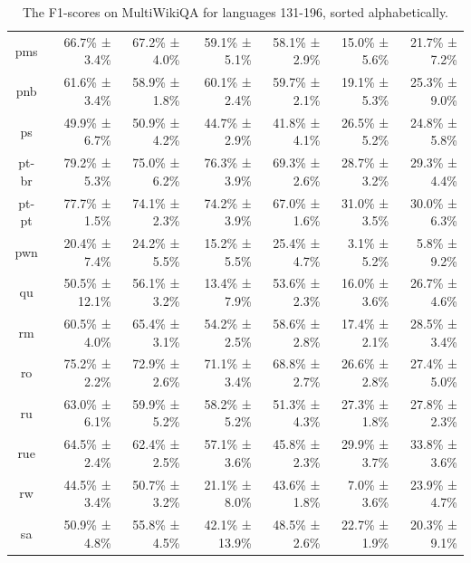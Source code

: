 \documentclass[10pt, a4paper]{article}
\begin{document}
\begin{table}[h]
\begin{tabular}{crrrrrr}
pms & 66.7\% ± 3.4\% & 67.2\% ± 4.0\% & 59.1\% ± 5.1\% & 58.1\% ± 2.9\% & 15.0\% ± 5.6\% & 21.7\% ± 7.2\% \\
pnb & 61.6\% ± 3.4\% & 58.9\% ± 1.8\% & 60.1\% ± 2.4\% & 59.7\% ± 2.1\% & 19.1\% ± 5.3\% & 25.3\% ± 9.0\% \\
ps & 49.9\% ± 6.7\% & 50.9\% ± 4.2\% & 44.7\% ± 2.9\% & 41.8\% ± 4.1\% & 26.5\% ± 5.2\% & 24.8\% ± 5.8\% \\
pt-br & 79.2\% ± 5.3\% & 75.0\% ± 6.2\% & 76.3\% ± 3.9\% & 69.3\% ± 2.6\% & 28.7\% ± 3.2\% & 29.3\% ± 4.4\% \\
pt-pt & 77.7\% ± 1.5\% & 74.1\% ± 2.3\% & 74.2\% ± 3.9\% & 67.0\% ± 1.6\% & 31.0\% ± 3.5\% & 30.0\% ± 6.3\% \\
pwn & 20.4\% ± 7.4\% & 24.2\% ± 5.5\% & 15.2\% ± 5.5\% & 25.4\% ± 4.7\% & 3.1\% ± 5.2\% & 5.8\% ± 9.2\% \\
qu & 50.5\% ± 12.1\% & 56.1\% ± 3.2\% & 13.4\% ± 7.9\% & 53.6\% ± 2.3\% & 16.0\% ± 3.6\% & 26.7\% ± 4.6\% \\
rm & 60.5\% ± 4.0\% & 65.4\% ± 3.1\% & 54.2\% ± 2.5\% & 58.6\% ± 2.8\% & 17.4\% ± 2.1\% & 28.5\% ± 3.4\% \\
ro & 75.2\% ± 2.2\% & 72.9\% ± 2.6\% & 71.1\% ± 3.4\% & 68.8\% ± 2.7\% & 26.6\% ± 2.8\% & 27.4\% ± 5.0\% \\
ru & 63.0\% ± 6.1\% & 59.9\% ± 5.2\% & 58.2\% ± 5.2\% & 51.3\% ± 4.3\% & 27.3\% ± 1.8\% & 27.8\% ± 2.3\% \\
rue & 64.5\% ± 2.4\% & 62.4\% ± 2.5\% & 57.1\% ± 3.6\% & 45.8\% ± 2.3\% & 29.9\% ± 3.7\% & 33.8\% ± 3.6\% \\
rw & 44.5\% ± 3.4\% & 50.7\% ± 3.2\% & 21.1\% ± 8.0\% & 43.6\% ± 1.8\% & 7.0\% ± 3.6\% & 23.9\% ± 4.7\% \\
sa & 50.9\% ± 4.8\% & 55.8\% ± 4.5\% & 42.1\% ± 13.9\% & 48.5\% ± 2.6\% & 22.7\% ± 1.9\% & 20.3\% ± 9.1\% \\
\bottomrule
\end{tabular}
\caption{The F1-scores on MultiWikiQA for languages 131-196, sorted alphabetically.}
\label{tab:num-samples-in-small-subsets}
\end{table}
\end{document}
